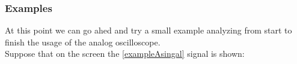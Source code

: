 \documentclass[../main.tex]{subfiles}
\begin{document}
\subsubsection{Examples}

At this point we can go ahed and try a small example analyzing from start to finish the usage of the analog oscilloscope.\\


Suppose that on the screen the \autoref{exampleAsingal} signal is shown:

\begin{figure}[h!]
\begin{center}

\end{center}
\end{figure}
\end{document}
